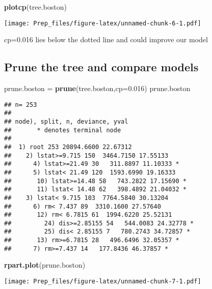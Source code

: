 \documentclass[]{article}
\newenvironment{Shaded}{\begin{snugshade}}{\end{snugshade}}
\newcommand{\CommentTok}[1]{\textcolor[rgb]{0.56,0.35,0.01}{\textit{#1}}}
\newcommand{\DataTypeTok}[1]{\textcolor[rgb]{0.13,0.29,0.53}{#1}}
\newcommand{\DecValTok}[1]{\textcolor[rgb]{0.00,0.00,0.81}{#1}}
\newcommand{\FloatTok}[1]{\textcolor[rgb]{0.00,0.00,0.81}{#1}}
\newcommand{\KeywordTok}[1]{\textcolor[rgb]{0.13,0.29,0.53}{\textbf{#1}}}
\newcommand{\NormalTok}[1]{#1}
\newcommand{\OperatorTok}[1]{\textcolor[rgb]{0.81,0.36,0.00}{\textbf{#1}}}
\newcommand{\StringTok}[1]{\textcolor[rgb]{0.31,0.60,0.02}{#1}}
\begin{document}
\begin{Shaded}
\begin{Highlighting}[]
\KeywordTok{plotcp}\NormalTok{(tree.boston)}
\end{Highlighting}
\end{Shaded}

\texttt{[image: Prep\_files/figure-latex/unnamed-chunk-6-1.pdf]}

cp=0.016 lies below the dotted line and could improve our model

\hypertarget{prune-the-tree-and-compare-models}{%
\subsection{Prune the tree and compare
models}\label{prune-the-tree-and-compare-models}}

\begin{Shaded}
\begin{Highlighting}[]
\NormalTok{prune.boston =}\StringTok{ }\KeywordTok{prune}\NormalTok{(tree.boston,}\DataTypeTok{cp=}\FloatTok{0.016}\NormalTok{)}
\NormalTok{prune.boston}
\end{Highlighting}
\end{Shaded}

\begin{verbatim}
## n= 253 
## 
## node), split, n, deviance, yval
##       * denotes terminal node
## 
##  1) root 253 20894.6600 22.67312  
##    2) lstat>=9.715 150  3464.7150 17.55133  
##      4) lstat>=21.49 30   311.8897 11.10333 *
##      5) lstat< 21.49 120  1593.6990 19.16333  
##       10) lstat>=14.48 58   743.2822 17.15690 *
##       11) lstat< 14.48 62   398.4892 21.04032 *
##    3) lstat< 9.715 103  7764.5840 30.13204  
##      6) rm< 7.437 89  3310.1600 27.57640  
##       12) rm< 6.7815 61  1994.6220 25.52131  
##         24) dis>=2.85155 54   544.0083 24.32778 *
##         25) dis< 2.85155 7   780.2743 34.72857 *
##       13) rm>=6.7815 28   496.6496 32.05357 *
##      7) rm>=7.437 14   177.8436 46.37857 *
\end{verbatim}

\begin{Shaded}
\begin{Highlighting}[]
\KeywordTok{rpart.plot}\NormalTok{(prune.boston)}
\end{Highlighting}
\end{Shaded}

\texttt{[image: Prep\_files/figure-latex/unnamed-chunk-7-1.pdf]}

\begin{Shaded}
\end{Shaded}
\end{document}
